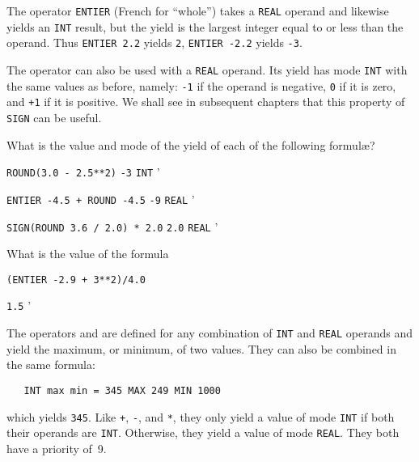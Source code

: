 The operator \verb|ENTIER| (French for ``whole'') takes a \verb|REAL|
operand and likewise yields an \verb|INT| result, but the yield is
the largest integer equal to or less than the operand. Thus
\verb|ENTIER 2.2| yields \verb|2|, \verb|ENTIER -2.2| yields
\verb|-3|.

The operator  can also be used with a \verb|REAL| operand.
Its yield has mode \verb|INT| with the same values as before, namely:
\verb|-1| if the operand is negative, \verb|0| if it is zero, and
\verb|+1| if it is positive. We shall see in subsequent chapters that
this property of \verb|SIGN| can be useful.

\begin{exercise}
\item What is the value and mode of the yield of each of the following
formul{\ae}?
\begin{subex}
\item \verb|ROUND(3.0 - 2.5**2)| \subans \verb|-3| \verb|INT|
'
\item \verb|ENTIER -4.5 + ROUND -4.5| \subans \verb|-9| \verb|REAL|
'
\item \verb|SIGN(ROUND 3.6 / 2.0) * 2.0| \subans \verb|2.0|
\verb|REAL|
'
\end{subex}
\item What is the value of the formula
\begin{verbatim}
(ENTIER -2.9 + 3**2)/4.0
\end{verbatim}
\indent \ans \verb|1.5|
'
\end{exercise}

The operators  and  are defined for any
combination of \verb|INT| and \verb|REAL| operands and yield the
maximum, or minimum, of two values. They can also be combined in the
same formula:
\begin{verbatim}
   INT max min = 345 MAX 249 MIN 1000
\end{verbatim}
\noindent
which yields \verb|345|.  Like \verb|+|, \verb|-|, and \verb|*|, they
only yield a value of mode \verb|INT| if both their operands are
\verb|INT|.  Otherwise, they yield a value of mode \verb|REAL|.  They
both have a priority of~9.

